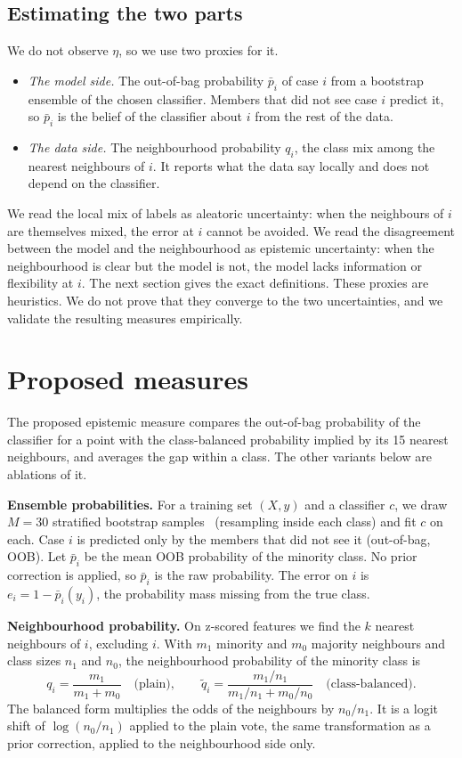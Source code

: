 \documentclass[preprint,12pt]{elsarticle}
\begin{document}
\subsection{Estimating the two parts}
We do not observe $\eta$, so we use two proxies for it.
\begin{itemize}
\item \emph{The model side.} The out-of-bag probability $\bar p_i$ of case $i$ from a bootstrap ensemble of the chosen classifier. Members that did not see case $i$ predict it, so $\bar p_i$ is the belief of the classifier about $i$ from the rest of the data.
\item \emph{The data side.} The neighbourhood probability $q_i$, the class mix among the nearest neighbours of $i$. It reports what the data say locally and does not depend on the classifier.
\end{itemize}
We read the local mix of labels as aleatoric uncertainty: when the neighbours of $i$ are themselves mixed, the error at $i$ cannot be avoided. We read the disagreement between the model and the neighbourhood as epistemic uncertainty: when the neighbourhood is clear but the model is not, the model lacks information or flexibility at $i$. The next section gives the exact definitions. These proxies are heuristics. We do not prove that they converge to the two uncertainties, and we validate the resulting measures empirically.

\section{Proposed measures}\label{sec:method}
The proposed epistemic measure compares the out-of-bag probability of the classifier for a point with the class-balanced probability implied by its 15 nearest neighbours, and averages the gap within a class. The other variants below are ablations of it.

\textbf{Ensemble probabilities.} For a training set $(X,y)$ and a classifier $c$, we draw $M=30$ stratified bootstrap samples~\cite{Breiman1996} (resampling inside each class) and fit $c$ on each. Case $i$ is predicted only by the members that did not see it (out-of-bag, OOB). Let $\bar p_i$ be the mean OOB probability of the minority class. No prior correction is applied, so $\bar p_i$ is the raw probability. The error on $i$ is $e_i = 1-\bar p_i(y_i)$, the probability mass missing from the true class.

\textbf{Neighbourhood probability.} On z-scored features we find the $k$ nearest neighbours of $i$, excluding $i$. With $m_1$ minority and $m_0$ majority neighbours and class sizes $n_1$ and $n_0$, the neighbourhood probability of the minority class is
\begin{equation}
q_i = \frac{m_1}{m_1+m_0} \quad \text{(plain)}, \qquad
\tilde q_i = \frac{m_1/n_1}{m_1/n_1+m_0/n_0} \quad \text{(class-balanced)}.
\end{equation}
The balanced form multiplies the odds of the neighbours by $n_0/n_1$. It is a logit shift of $\log(n_0/n_1)$ applied to the plain vote, the same transformation as a prior correction, applied to the neighbourhood side only.
\end{document}
